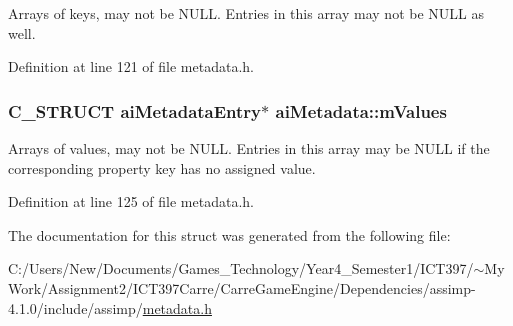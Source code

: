 Arrays of keys, may not be NULL. Entries in this array may not be NULL as well. 

Definition at line 121 of file metadata.h.\hypertarget{structai_metadata_34b515fcb5b806c471d3c6ce7bc76beb}{
\subsubsection[mValues]{\setlength{\rightskip}{0pt plus 5cm}C\_\-STRUCT {\bf aiMetadataEntry}$\ast$ {\bf aiMetadata::mValues}}}
\label{structai_metadata_34b515fcb5b806c471d3c6ce7bc76beb}


Arrays of values, may not be NULL. Entries in this array may be NULL if the corresponding property key has no assigned value. 

Definition at line 125 of file metadata.h.

The documentation for this struct was generated from the following file:\begin{CompactItemize}
\item 
C:/Users/New/Documents/Games\_\-Technology/Year4\_\-Semester1/ICT397/$\sim$My Work/Assignment2/ICT397Carre/CarreGameEngine/Dependencies/assimp-4.1.0/include/assimp/\hyperlink{metadata_8h}{metadata.h}\end{CompactItemize}
